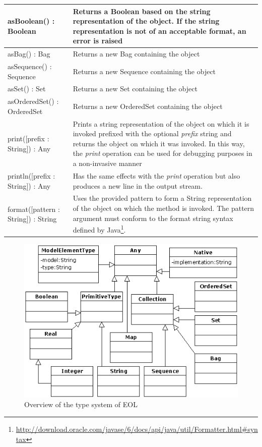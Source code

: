 \begin{longtable} {|p{5.5cm}|p{6.5cm}|}
			asBoolean() : Boolean & Returns a Boolean based on the string representation of the object. If the string representation is not of an acceptable format, an error is raised \\\hline
			
			asBag() : Bag & Returns a new Bag containing the object \\\hline
			
			asSequence() : Sequence & Returns a new Sequence containing the object \\\hline
			
			asSet() : Set & Returns a new Set containing the object \\\hline
			
			asOrderedSet() : OrderedSet & Returns a new OrderedSet containing the object \\\hline
			
			print([prefix : String]) : Any & Prints a string representation of the object on which it is invoked prefixed with the optional \emph{prefix} string and returns the object on which it was invoked. In this way, the \emph{print} operation can be used for debugging purposes in a non-invasive manner\\\hline
			
			println([prefix : String]) : Any & Has the same effects with the \emph{print} operation but also produces a new line in the output stream. \\\hline
			
			format([pattern : String]) : String & Uses the provided pattern to form a String representation of the object on which the method is invoked. The pattern argument must conform to the format string syntax defined by Java\footnote{\url{http://download.oracle.com/javase/6/docs/api/java/util/Formatter.html\#syntax}}. \\\hline

\end{longtable}

\begin{figure}[h]
  \centering
  \includegraphics{images/EOLTypes.png}
  \caption{Overview of the type system of EOL}
  \label{fig:EOLTypes}
\end{figure}

